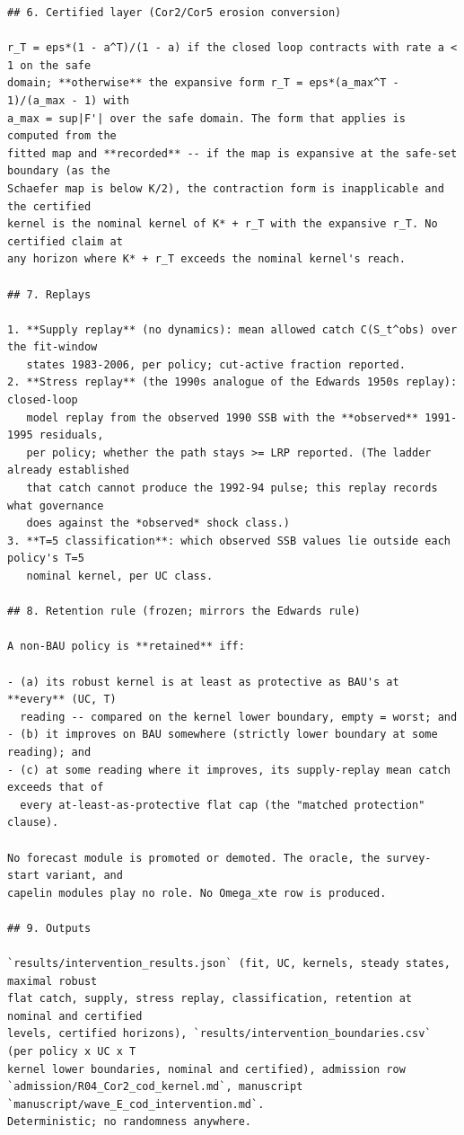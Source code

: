 \documentclass[11pt,a4paper]{article}
\begin{document}
\begin{footnotesize}
\begin{verbatim}
## 6. Certified layer (Cor2/Cor5 erosion conversion)

r_T = eps*(1 - a^T)/(1 - a) if the closed loop contracts with rate a < 1 on the safe
domain; **otherwise** the expansive form r_T = eps*(a_max^T - 1)/(a_max - 1) with
a_max = sup|F'| over the safe domain. The form that applies is computed from the
fitted map and **recorded** -- if the map is expansive at the safe-set boundary (as the
Schaefer map is below K/2), the contraction form is inapplicable and the certified
kernel is the nominal kernel of K* + r_T with the expansive r_T. No certified claim at
any horizon where K* + r_T exceeds the nominal kernel's reach.

## 7. Replays

1. **Supply replay** (no dynamics): mean allowed catch C(S_t^obs) over the fit-window
   states 1983-2006, per policy; cut-active fraction reported.
2. **Stress replay** (the 1990s analogue of the Edwards 1950s replay): closed-loop
   model replay from the observed 1990 SSB with the **observed** 1991-1995 residuals,
   per policy; whether the path stays >= LRP reported. (The ladder already established
   that catch cannot produce the 1992-94 pulse; this replay records what governance
   does against the *observed* shock class.)
3. **T=5 classification**: which observed SSB values lie outside each policy's T=5
   nominal kernel, per UC class.

## 8. Retention rule (frozen; mirrors the Edwards rule)

A non-BAU policy is **retained** iff:

- (a) its robust kernel is at least as protective as BAU's at **every** (UC, T)
  reading -- compared on the kernel lower boundary, empty = worst; and
- (b) it improves on BAU somewhere (strictly lower boundary at some reading); and
- (c) at some reading where it improves, its supply-replay mean catch exceeds that of
  every at-least-as-protective flat cap (the "matched protection" clause).

No forecast module is promoted or demoted. The oracle, the survey-start variant, and
capelin modules play no role. No Omega_xte row is produced.

## 9. Outputs

`results/intervention_results.json` (fit, UC, kernels, steady states, maximal robust
flat catch, supply, stress replay, classification, retention at nominal and certified
levels, certified horizons), `results/intervention_boundaries.csv` (per policy x UC x T
kernel lower boundaries, nominal and certified), admission row
`admission/R04_Cor2_cod_kernel.md`, manuscript `manuscript/wave_E_cod_intervention.md`.
Deterministic; no randomness anywhere.

\end{verbatim}\end{footnotesize}
\end{document}

